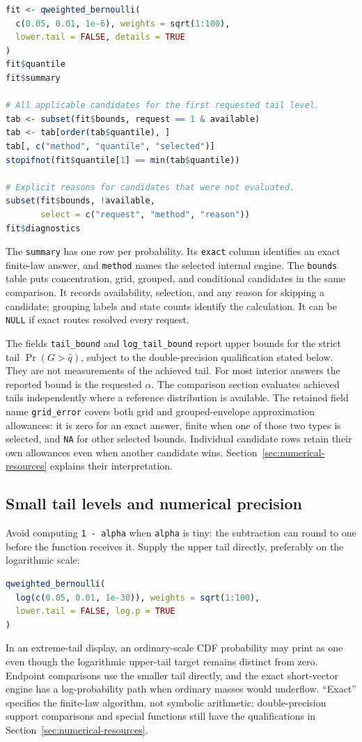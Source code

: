 \documentclass[11pt,letterpaper]{article}
\numberwithin{equation}{section}
\theoremstyle{definition}
\theoremstyle{remark}
\begin{document}
\begin{lstlisting}[language=R]
fit <- qweighted_bernoulli(
  c(0.05, 0.01, 1e-6), weights = sqrt(1:100),
  lower.tail = FALSE, details = TRUE
)
fit$quantile
fit$summary

# All applicable candidates for the first requested tail level.
tab <- subset(fit$bounds, request == 1 & available)
tab <- tab[order(tab$quantile), ]
tab[, c("method", "quantile", "selected")]
stopifnot(fit$quantile[1] == min(tab$quantile))

# Explicit reasons for candidates that were not evaluated.
subset(fit$bounds, !available,
       select = c("request", "method", "reason"))
fit$diagnostics
\end{lstlisting}
The \texttt{summary} has one row per probability. Its \texttt{exact}
column identifies an exact finite-law answer, and \texttt{method} names
the selected internal engine. The \texttt{bounds} table puts concentration,
grid, grouped, and conditional candidates in the same comparison.
It records availability, selection, and any reason for skipping a
candidate; grouping labels and state counts identify the calculation.
It can be \texttt{NULL} if exact routes resolved every request.

The fields \texttt{tail\_bound} and \texttt{log\_tail\_bound} report upper
bounds for the strict tail $\Pr(G>\widehat q)$, subject to the
double-precision qualification stated below. They are not measurements
of the achieved tail.
For most interior answers the reported bound is the requested $\alpha$.
The comparison section evaluates achieved tails independently where a
reference distribution is available. The retained field name
\texttt{grid\_error} covers both grid and grouped-envelope approximation
allowances: it is zero for an exact answer, finite when one of those two
types is selected, and \texttt{NA} for other selected bounds. Individual
candidate rows retain their own allowances even when another candidate
wins. Section~\ref{sec:numerical-resources} explains their interpretation.

\subsection{Small tail levels and numerical precision}

Avoid computing \texttt{1 - alpha} when \texttt{alpha} is tiny: the
subtraction can round to one before the function receives it. Supply the
upper tail directly, preferably on the logarithmic scale:
\begin{lstlisting}[language=R]
qweighted_bernoulli(
  log(c(0.05, 0.01, 1e-30)), weights = sqrt(1:100),
  lower.tail = FALSE, log.p = TRUE
)
\end{lstlisting}
In an extreme-tail display, an ordinary-scale CDF probability may print as
one even though the logarithmic upper-tail target remains distinct from
zero. Endpoint comparisons use the smaller tail directly, and the exact
short-vector engine has a log-probability path when ordinary masses would
underflow. ``Exact'' specifies the finite-law algorithm, not symbolic
arithmetic: double-precision support comparisons and special functions
still have the qualifications in Section~\ref{sec:numerical-resources}.
\end{document}
